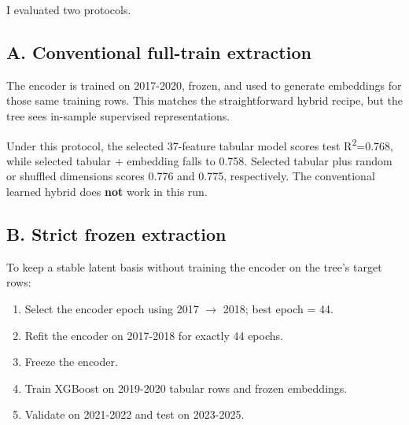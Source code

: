 \documentclass[11pt]{article}
\begin{document}
I evaluated two protocols.

\subsection{A. Conventional full-train extraction}

The encoder is trained on 2017-2020, frozen, and used to generate embeddings for those same training rows. This matches the straightforward hybrid recipe, but the tree sees in-sample supervised representations.

Under this protocol, the selected 37-feature tabular model scores test R\textsuperscript{2}=0.768, while selected tabular + embedding falls to 0.758. Selected tabular plus random or shuffled dimensions scores 0.776 and 0.775, respectively. The conventional learned hybrid does \textbf{not} work in this run.

\subsection{B. Strict frozen extraction}

To keep a stable latent basis without training the encoder on the tree's target rows:

\begin{enumerate}
\item Select the encoder epoch using 2017 $\rightarrow$ 2018; best epoch = 44.
\item Refit the encoder on 2017-2018 for exactly 44 epochs.
\item Freeze the encoder.
\item Train XGBoost on 2019-2020 tabular rows and frozen embeddings.
\item Validate on 2021-2022 and test on 2023-2025.
\end{enumerate}
\end{document}

